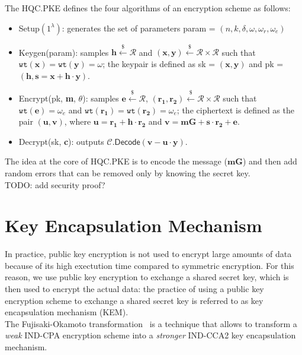 The \textsf{HQC.PKE} defines the four algorithms of an encryption scheme as follows:
\begin{itemize}
    \item \textsf{Setup}$(1^\lambda)$: generates the set of parameters \textsf{param} = $(n, k, \delta, \omega, \omega_r, \omega_e)$
    \item \textsf{Keygen(param)}: samples $\mathbf{h} \xleftarrow{\mathdollar} \mathcal{R}$ and 
    $(\mathbf{x}, \mathbf{y}) \xleftarrow{\mathdollar} \mathcal{R} \times \mathcal{R}$ such that $\texttt{wt}(\mathbf{x}) = \texttt{wt}(\mathbf{y}) = \omega$;
    the keypair is defined as \textsf{sk} = $(\mathbf{x}, \mathbf{y})$ and \textsf{pk} = $(\mathbf{h}, \mathbf{s} = \mathbf{x} + \mathbf{h\cdot y})$.
    \item \textsf{Encrypt(pk, \textbf{m}, $\theta$)}: samples $\mathbf{e} \xleftarrow{\mathdollar} \mathcal{R}$, $(\mathbf{r_1}, \mathbf{r_2}) \xleftarrow{\mathdollar} \mathcal{R} \times \mathcal{R}$ such that
     $\texttt{wt}(\mathbf{e}) = \omega_e$ and $\texttt{wt}(\mathbf{r_1}) = \texttt{wt}(\mathbf{r_2}) = \omega_e$;  the ciphertext is defined as the pair
     $(\mathbf{u}, \mathbf{v})$, where $\mathbf{u} = \mathbf{r_1} + \mathbf{h}\cdot\mathbf{r_2}$ and $\mathbf{v} = \mathbf{mG} + \mathbf{s\cdot r_2} + \mathbf{e}$.
    \item \textsf{Decrypt(sk, \textbf{c})}: outputs $\mathcal{C}.\textsf{Decode}(\mathbf{v} - \mathbf{u\cdot y})$.
\end{itemize}

The idea at the core of \textsf{HQC.PKE} is to encode the message ($\mathbf{mG}$) and then add random errors that can be removed only by knowing the secret key.\\

TODO: add security proof?

\section{Key Encapsulation Mechanism}\label{sec:kem}
In practice, public key encryption is not used to encrypt large amounts of data because of its high exectution time compared to symmetric encryption.
For this reason, we use public key encryption to exchange a shared secret key, which is then used to encrypt the actual data: the practice
of using a public key encryption scheme to exchange a shared secret key is referred to as key encapsulation mechanism (KEM).\\
The Fujisaki-Okamoto transformation~\cite{fujisaki2013secure} is a technique that allows to transform a \textit{weak} IND-CPA encryption scheme
into a \textit{stronger} IND-CCA2 key encapsulation mechanism.

